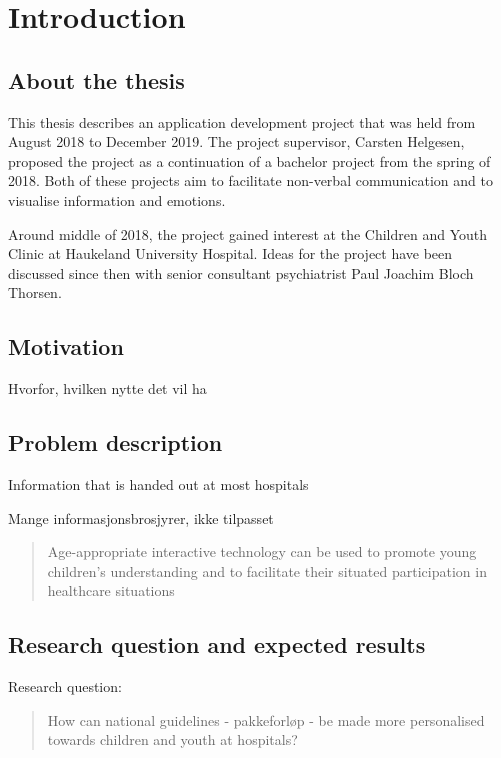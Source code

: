 \chapter{Introduction}
\label{ch:introduction}

\section{About the thesis}

This thesis describes an application development project that was held from August 2018 to December 2019. The project supervisor, Carsten Helgesen, proposed the project as a continuation of a bachelor project from the spring of 2018. Both of these projects aim to facilitate non-verbal communication and to visualise information and emotions.

Around middle of 2018, the project gained interest at the Children and Youth Clinic at Haukeland University Hospital. Ideas for the project have been discussed since then with senior consultant psychiatrist Paul Joachim Bloch Thorsen.

\section{Motivation}

Hvorfor, hvilken nytte det vil ha

\section{Problem description}

Information that is handed out at most hospitals 

Mange informasjonsbrosjyrer, ikke tilpasset

\begin{quote}
    Age-appropriate interactive technology can be used to promote young children’s understanding and to facilitate their situated participation in healthcare situations \cite{stalberg2018}
\end{quote}

\section{Research question and expected results}

Research question:

\begin{quote}
    How can national guidelines - pakkeforløp - be made more personalised towards children and youth at hospitals?
\end{quote}

